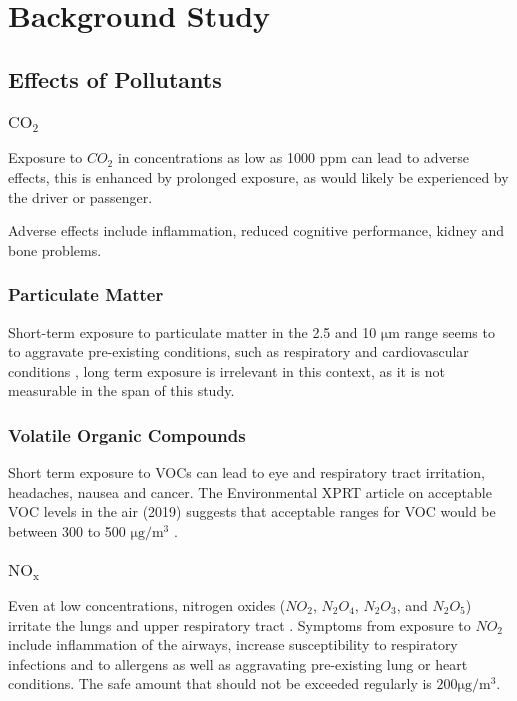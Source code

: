 \chapter{Background Study}





\section{Effects of Pollutants}
\subsection{$\mathrm{CO_2}$}
Exposure to $CO_2$ in concentrations as low as 1000 ppm can lead to adverse effects\cite{healthrisksco2}, this is enhanced by prolonged exposure, as would likely be experienced by the driver or passenger. 

\noindent
Adverse effects include\cite{co2effects} inflammation, reduced cognitive performance, kidney and bone problems.

\subsection{Particulate Matter}
Short-term exposure to particulate matter in the 2.5 and 10 $ \si{\micro\meter} $ range seems to to aggravate pre-existing conditions, such as respiratory and cardiovascular conditions \cite{pmparticles}, long term exposure is irrelevant in this context, as it is not measurable in the span of this study.


\subsection{Volatile Organic Compounds}
Short term exposure to VOCs can lead to eye and respiratory tract irritation, headaches, nausea and cancer\cite{safevocs}.
The Environmental XPRT article on acceptable VOC levels in the air (2019) \cite{vocs} suggests that acceptable ranges for VOC would be between 300 to 500 $ \si{\micro\gram} / \si{\meter}^3 $ .

\subsection{$\mathrm{NO_x}$}
Even at low concentrations, nitrogen oxides ($NO_2$, $N_{2}O_{4}$, $N_{2}O_{3}$, and $N_{2}O_{5}$) irritate the lungs and upper respiratory tract \cite{cdcitation}.
Symptoms from exposure to $NO_2$ include inflammation of the airways, increase susceptibility to respiratory infections and to allergens as well as aggravating pre-existing lung or heart conditions. The safe amount that should not be exceeded regularly is $200 \si{\micro\gram} / \si{\meter}^3 $.\cite{safenox}


